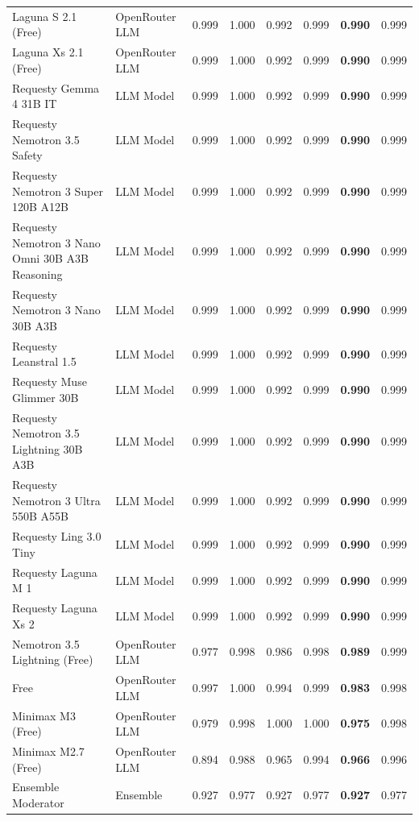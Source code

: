 \begin{table}[t]
\begin{tabular}{llcccccc}
Laguna S 2.1 (Free) & OpenRouter LLM & 0.999 & 1.000 & 0.992 & 0.999 & \textbf{0.990} & 0.999 \\
Laguna Xs 2.1 (Free) & OpenRouter LLM & 0.999 & 1.000 & 0.992 & 0.999 & \textbf{0.990} & 0.999 \\
Requesty Gemma 4 31B IT & LLM Model & 0.999 & 1.000 & 0.992 & 0.999 & \textbf{0.990} & 0.999 \\
Requesty Nemotron 3.5 Safety & LLM Model & 0.999 & 1.000 & 0.992 & 0.999 & \textbf{0.990} & 0.999 \\
Requesty Nemotron 3 Super 120B A12B & LLM Model & 0.999 & 1.000 & 0.992 & 0.999 & \textbf{0.990} & 0.999 \\
Requesty Nemotron 3 Nano Omni 30B A3B Reasoning & LLM Model & 0.999 & 1.000 & 0.992 & 0.999 & \textbf{0.990} & 0.999 \\
Requesty Nemotron 3 Nano 30B A3B & LLM Model & 0.999 & 1.000 & 0.992 & 0.999 & \textbf{0.990} & 0.999 \\
Requesty Leanstral 1.5 & LLM Model & 0.999 & 1.000 & 0.992 & 0.999 & \textbf{0.990} & 0.999 \\
Requesty Muse Glimmer 30B & LLM Model & 0.999 & 1.000 & 0.992 & 0.999 & \textbf{0.990} & 0.999 \\
Requesty Nemotron 3.5 Lightning 30B A3B & LLM Model & 0.999 & 1.000 & 0.992 & 0.999 & \textbf{0.990} & 0.999 \\
Requesty Nemotron 3 Ultra 550B A55B & LLM Model & 0.999 & 1.000 & 0.992 & 0.999 & \textbf{0.990} & 0.999 \\
Requesty Ling 3.0 Tiny & LLM Model & 0.999 & 1.000 & 0.992 & 0.999 & \textbf{0.990} & 0.999 \\
Requesty Laguna M 1 & LLM Model & 0.999 & 1.000 & 0.992 & 0.999 & \textbf{0.990} & 0.999 \\
Requesty Laguna Xs 2 & LLM Model & 0.999 & 1.000 & 0.992 & 0.999 & \textbf{0.990} & 0.999 \\
Nemotron 3.5 Lightning (Free) & OpenRouter LLM & 0.977 & 0.998 & 0.986 & 0.998 & \textbf{0.989} & 0.999 \\
Free & OpenRouter LLM & 0.997 & 1.000 & 0.994 & 0.999 & \textbf{0.983} & 0.998 \\
Minimax M3 (Free) & OpenRouter LLM & 0.979 & 0.998 & 1.000 & 1.000 & \textbf{0.975} & 0.998 \\
Minimax M2.7 (Free) & OpenRouter LLM & 0.894 & 0.988 & 0.965 & 0.994 & \textbf{0.966} & 0.996 \\
\midrule
Ensemble Moderator & Ensemble & 0.927 & 0.977 & 0.927 & 0.977 & \textbf{0.927} & 0.977 \\

\end{tabular}
\end{table}
